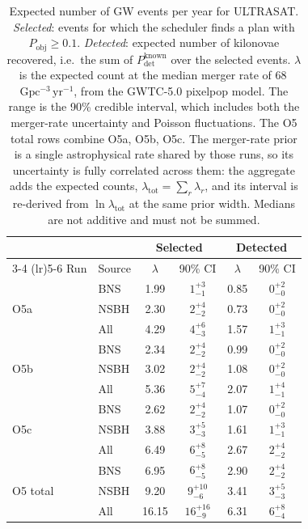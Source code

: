 \begin{table}[!htb]
\centering
\renewcommand\arraystretch{1.15}
\setlength{\tabcolsep}{0.22cm}
\caption{Expected number of GW events per year for ULTRASAT. \emph{Selected}: events for which the scheduler finds a plan with $P_\mathrm{obj} \geq 0.1$. \emph{Detected}: expected number of kilonovae recovered, i.e.\ the sum of $P_\mathrm{det}^\mathrm{known}$ over the selected events. $\lambda$ is the expected count at the median merger rate of 68\,$\mathrm{Gpc^{-3}\,yr^{-1}}$, from the GWTC-5.0 pixelpop model. The range is the 90\% credible interval, which includes both the merger-rate uncertainty and Poisson fluctuations. The O5 total rows combine O5a, O5b, O5c. The merger-rate prior is a single astrophysical rate shared by those runs, so its uncertainty is fully correlated across them: the aggregate adds the expected counts, $\lambda_\mathrm{tot} = \sum_r \lambda_r$, and its interval is re-derived from $\ln \lambda_\mathrm{tot}$ at the same prior width. Medians are not additive and must not be summed.}
\label{tab:ultrasat-geodesic-selected-detected-1yr}
\begin{tabular}{llcccc}
\toprule
 & & \multicolumn{2}{c}{Selected} & \multicolumn{2}{c}{Detected} \\
\cmidrule(lr){3-4} \cmidrule(lr){5-6}
Run & Source & $\lambda$ & 90\% CI & $\lambda$ & 90\% CI \\
\midrule
\multirow{3}{*}{O5a} & BNS  & 1.99 & $1^{+3}_{-1}$ & 0.85 & $0^{+2}_{-0}$ \\
                     & NSBH & 2.30 & $2^{+4}_{-2}$ & 0.73 & $0^{+2}_{-0}$ \\
                     & All  & 4.29 & $4^{+6}_{-3}$ & 1.57 & $1^{+3}_{-1}$ \\
\midrule
\multirow{3}{*}{O5b} & BNS  & 2.34 & $2^{+4}_{-2}$ & 0.99 & $0^{+2}_{-0}$ \\
                     & NSBH & 3.02 & $2^{+4}_{-2}$ & 1.08 & $0^{+2}_{-0}$ \\
                     & All  & 5.36 & $5^{+7}_{-4}$ & 2.07 & $1^{+4}_{-1}$ \\
\midrule
\multirow{3}{*}{O5c} & BNS  & 2.62 & $2^{+4}_{-2}$ & 1.07 & $0^{+2}_{-0}$ \\
                     & NSBH & 3.88 & $3^{+5}_{-3}$ & 1.61 & $1^{+3}_{-1}$ \\
                     & All  & 6.49 & $6^{+8}_{-5}$ & 2.67 & $2^{+4}_{-2}$ \\
\midrule
\multirow{3}{*}{O5 total} & BNS  & 6.95 & $6^{+8}_{-5}$ & 2.90 & $2^{+4}_{-2}$ \\
                          & NSBH & 9.20 & $9^{+10}_{-6}$ & 3.41 & $3^{+5}_{-3}$ \\
                          & All  & 16.15 & $16^{+16}_{-9}$ & 6.31 & $6^{+8}_{-4}$ \\
\bottomrule
\end{tabular}
\end{table}
